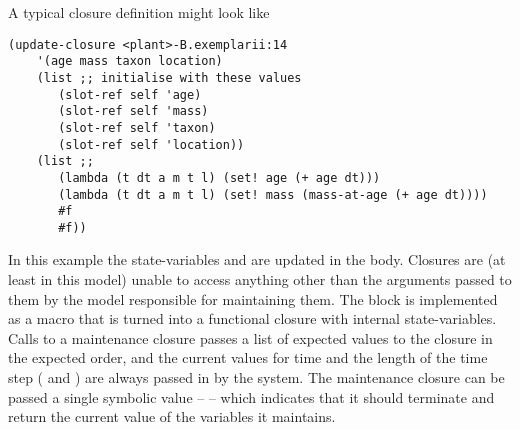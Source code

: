 A typical closure definition might look like
\begin{verbatim}
(update-closure <plant>-B.exemplarii:14 
    '(age mass taxon location)
    (list ;; initialise with these values
       (slot-ref self 'age)
       (slot-ref self 'mass)
       (slot-ref self 'taxon)
       (slot-ref self 'location))
    (list ;; 
       (lambda (t dt a m t l) (set! age (+ age dt)))
       (lambda (t dt a m t l) (set! mass (mass-at-age (+ age dt))))
       #f
       #f))

\end{verbatim}
In this example the state-variables  and 
are updated in the body.  Closures are (at least in this model) unable
to access anything other than the arguments passed to them by the
model responsible for maintaining them.  The 
block is implemented as a macro that is turned into a functional
closure with internal state-variables.  Calls to a maintenance closure
passes a list of expected values to the closure in the expected
order, and the current values for time and the length of the time
step ( and ) are
always passed in by the system.  The maintenance closure can be passed
a single symbolic value --  -- which indicates that it
should terminate and return the current value of the variables it maintains.





